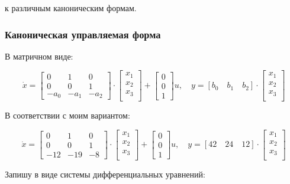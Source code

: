 \documentclass[a4paper,12pt]{article}
\begin{document}
	к различным каноническим формам.
	
	\subsubsection{Каноническая управляемая форма}
	
	В матричном виде:
	
	\[
	\dot{x} = 
	\begin{bmatrix}
		0 & 1 & 0 \\
		0 & 0 & 1 \\
		-a_0 & -a_1 & -a_2
	\end{bmatrix} \cdot 
	\begin{bmatrix}
		x_1 \\x_2\\x_3\\
	\end{bmatrix} + 
	\begin{bmatrix}
		0 \\ 0 \\ 1
	\end{bmatrix} u,
	\quad
	y = [b_0 \quad b_1 \quad b_2] \cdot 
	\begin{bmatrix}
		x_1 \\x_2\\x_3\\
	\end{bmatrix}
	\]
	
	В соответствии с моим вариантом: 

	\[
	\dot{x} = 
	\begin{bmatrix}
		0 & 1 & 0 \\
		0 & 0 & 1 \\
		-12 & -19 & -8
	\end{bmatrix} \cdot 
	\begin{bmatrix}
		x_1 \\x_2\\x_3\\
	\end{bmatrix} + 
	\begin{bmatrix}
		0 \\ 0 \\ 1
	\end{bmatrix} u,
	\quad
	y = [42 \quad 24 \quad 12] \cdot 
	\begin{bmatrix}
		x_1 \\x_2\\x_3\\
	\end{bmatrix}
	\]
	
	Запишу в виде системы дифференциальных уравнений:
	
\end{document}
